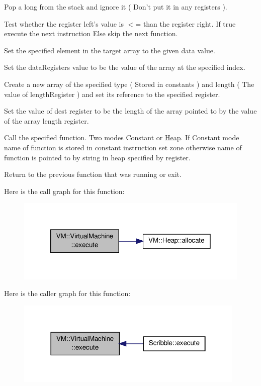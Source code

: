 Pop a long from the stack and ignore it ( Don't put it in any registers ).

Test whether the register left's value is $<$= than the register right. If true execute the next instruction Else skip the next function.

Set the specified element in the target array to the given data value.

Set the data\-Registers value to be the value of the array at the specified index.

Create a new array of the specified type ( Stored in constants ) and length ( The value of length\-Register ) and set its reference to the specified register.

Set the value of dest register to be the length of the array pointed to by the value of the array length register.

Call the specified function. Two modes Constant or \hyperlink{class_v_m_1_1_heap}{Heap}. If Constant mode name of function is stored in constant instruction set zone otherwise name of function is pointed to by string in heap specified by register.

Return to the previous function that was running or exit.

Here is the call graph for this function\-:\nopagebreak
\begin{figure}[H]
\begin{center}
\leavevmode
\includegraphics[width=320pt]{class_v_m_1_1_virtual_machine_addc13d6dc68198f867b7ff8e21746af7_cgraph}
\end{center}
\end{figure}




Here is the caller graph for this function\-:\nopagebreak
\begin{figure}[H]
\begin{center}
\leavevmode
\includegraphics[width=310pt]{class_v_m_1_1_virtual_machine_addc13d6dc68198f867b7ff8e21746af7_icgraph}
\end{center}
\end{figure}


